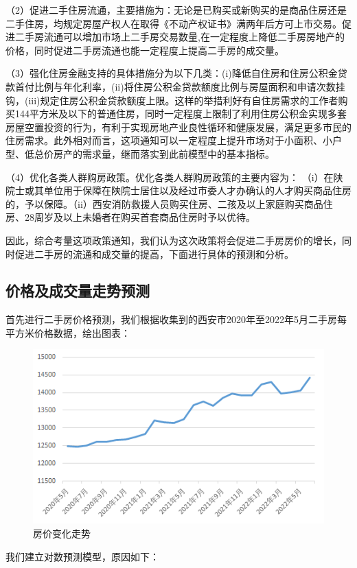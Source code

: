 \documentclass[withoutpreface,bwprint]{cumcmthesis} %
\begin{document}
（2）促进二手住房流通，主要措施为：无论是已购买或新购买的是商品住房还是二手住房，均规定房屋产权人在取得《不动产权证书》满两年后方可上市交易。促进二手房流通可以增加市场上二手房交易数量,在一定程度上降低二手房房地产的价格\cite{RN4}，同时促进二手房流通也能一定程度上提高二手房的成交量。

（3）强化住房金融支持的具体措施分为以下几类：(i)降低自住房和住房公积金贷款首付比例与年化利率，(ii)将住房公积金贷款额度比例与房屋面积和申请次数挂钩，(iii)规定住房公积金贷款额度上限。这样的举措利好有自住房需求的工作者购买144平方米及以下的普通住房，同时一定程度上限制了利用住房公积金实现多套房屋空置投资的行为，有利于实现房地产业良性循环和健康发展，满足更多市民的住房需求。此外相对而言，这项通知可以一定程度上提升市场对于小面积、小户型、低总价房产的需求量，继而落实到此前模型中的基本指标。

（4）优化各类人群购房政策。优化各类人群购房政策的主要内容为：
（i）在陕院士或其单位用于保障在陕院士居住以及经过市委人才办确认的人才购买商品住房的，予以保障。（ii）西安消防救援人员购买住房、二孩及以上家庭购买商品住房、28周岁及以上未婚者在购买首套商品住房时予以优待。

因此，综合考量这项政策通知，我们认为这次政策将会促进二手房房价的增长，同时促进二手房的流通和成交量的提高，下面进行具体的预测和分析。
\subsection{价格及成交量走势预测}
首先进行二手房价格预测，我们根据收集到的西安市2020年至2022年5月二手房每平方米价格数据\cite{RN5}，绘出图表：
\begin{figure}[H]
    \centering
    \includegraphics[scale=0.7]{房价变化走势.png}
    \caption{房价变化走势}
    \label{fig:房价变化走势}
\end{figure}

我们建立对数预测模型，原因如下：
\end{document}

